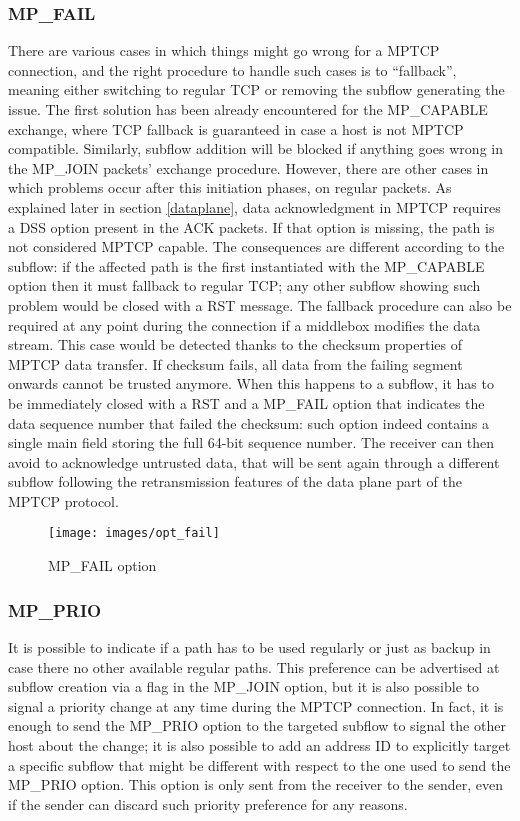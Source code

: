 \subsubsection{MP\_FAIL}
There are various cases in which things might go wrong for a MPTCP connection, and the right procedure to handle such cases is to ``fallback'', meaning either switching to regular TCP or removing the subflow generating the issue. The first solution has been already encountered for the MP\_CAPABLE exchange, where TCP fallback is guaranteed in case a host is not MPTCP compatible. Similarly, subflow addition will be blocked if anything goes wrong in the MP\_JOIN packets' exchange procedure. However, there are other cases in which problems occur after this initiation phases, on regular packets. 
As explained later in section \ref{dataplane}, data acknowledgment in MPTCP requires a DSS option present in the ACK packets. If that option is missing, the path is not considered MPTCP capable. The consequences are different according to the subflow: if the affected path is the first instantiated with the MP\_CAPABLE option then it must fallback to regular TCP; any other subflow showing such problem would be closed with a RST message. 
The fallback procedure can also be required at any point during the connection if a middlebox modifies the data stream. This case would be detected thanks to the checksum properties of MPTCP data transfer. If checksum fails, all data from the failing segment onwards cannot be trusted anymore. When this happens to a subflow, it has to be immediately closed with a RST and a MP\_FAIL option that indicates the data sequence number that failed the checksum: such option indeed contains a single main field storing the full 64-bit sequence number. The receiver can then avoid to acknowledge untrusted data, that will be sent again through a different subflow following the retransmission features of the data plane part of the MPTCP protocol. 

\begin{figure}[!htb]
\centering
\texttt{[image: images/opt\_fail]}
\caption{MP\_FAIL option}
\label{fig:opt_fail}
\end{figure}

\subsubsection{MP\_PRIO}
It is possible to indicate if a path has to be used regularly or just as backup in case there no other available regular paths. This preference can be advertised at subflow creation via a flag in the MP\_JOIN option, but it is also possible to signal a priority change at any time during the MPTCP connection. In fact, it is enough to send the MP\_PRIO option to the targeted subflow to signal the other host about the change; it is also possible to add an address ID to explicitly target a specific subflow that might be different with respect to the one used to send the MP\_PRIO option. This option is only sent from the receiver to the sender, even if the sender can discard such priority preference for any reasons. 

